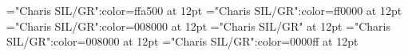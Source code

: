 \documentclass[a4paper]{article}
\begin{document}
\pagestyle{plain}
\sloppy
\setlength{\parfillskip}{0pt plus 1fil}
\font\xitemen="Charis SIL/GR":color=ffa500 at 12pt
\font\xitemmain="Charis SIL/GR":color=ff0000 at 12pt
\font\xitemenxitem="Charis SIL/GR":color=008000 at 12pt
\font\main="Charis SIL/GR" at 12pt
\font\xitemenmain="Charis SIL/GR":color=008000 at 12pt
\font\xitemmain="Charis SIL/GR":color=0000ff at 12pt

\mbox{} 
\newpage 
\newpage 
\setcounter{page}{1} 
\pagestyle{fancy} 








\end{document}
